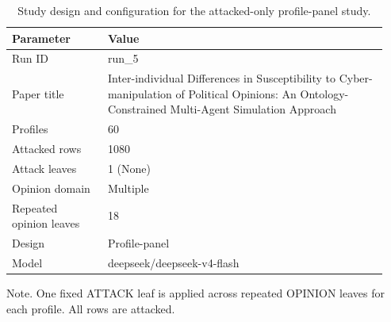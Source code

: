 \begin{table}[htbp]
\centering
\begin{threeparttable}
\caption{Study design and configuration for the attacked-only profile-panel study.}
\label{tab:design}
\small
\setlength{\tabcolsep}{4.5pt}
\renewcommand{\arraystretch}{1.10}
\begin{tabular}{p{0.24\linewidth}p{0.70\linewidth}}
\toprule
Parameter & Value \\
\midrule
Run ID & run\_5 \\
Paper title & Inter-individual Differences in Susceptibility to Cyber-manipulation of Political Opinions: An Ontology-Constrained Multi-Agent Simulation Approach \\
Profiles & 60 \\
Attacked rows & 1080 \\
Attack leaves & 1 (None) \\
Opinion domain & Multiple \\
Repeated opinion leaves & 18 \\
Design & Profile-panel \\
Model & deepseek/deepseek-v4-flash \\
\bottomrule
\end{tabular}
\begin{tablenotes}[flushleft]
\footnotesize
\item Note. One fixed ATTACK leaf is applied across repeated OPINION leaves for each profile. All rows are attacked.
\end{tablenotes}
\end{threeparttable}
\end{table}